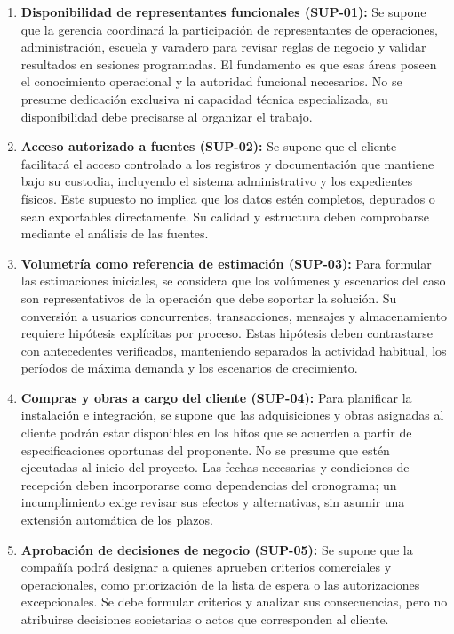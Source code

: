 \begin{enumerate}
    \item \textbf{Disponibilidad de representantes funcionales (SUP-01):} Se supone que la gerencia coordinará la participación de representantes de operaciones, administración, escuela y varadero para revisar reglas de negocio y validar resultados en sesiones programadas. El fundamento es que esas áreas poseen el conocimiento operacional y la autoridad funcional necesarios. No se presume dedicación exclusiva ni capacidad técnica especializada, su disponibilidad debe precisarse al organizar el trabajo.

    \item \textbf{Acceso autorizado a fuentes (SUP-02):} Se supone que el cliente facilitará el acceso controlado a los registros y documentación que mantiene bajo su custodia, incluyendo el sistema administrativo y los expedientes físicos. Este supuesto no implica que los datos estén completos, depurados o sean exportables directamente. Su calidad y estructura deben comprobarse mediante el análisis de las fuentes.

    \item \textbf{Volumetría como referencia de estimación (SUP-03):} Para formular las estimaciones iniciales, se considera que los volúmenes y escenarios del caso son representativos de la operación que debe soportar la solución. Su conversión a usuarios concurrentes, transacciones, mensajes y almacenamiento requiere hipótesis explícitas por proceso. Estas hipótesis deben contrastarse con antecedentes verificados, manteniendo separados la actividad habitual, los períodos de máxima demanda y los escenarios de crecimiento.

    \item \textbf{Compras y obras a cargo del cliente (SUP-04):} Para planificar la instalación e integración, se supone que las adquisiciones y obras asignadas al cliente podrán estar disponibles en los hitos que se acuerden a partir de especificaciones oportunas del proponente. No se presume que estén ejecutadas al inicio del proyecto. Las fechas necesarias y condiciones de recepción deben incorporarse como dependencias del cronograma; un incumplimiento exige revisar sus efectos y alternativas, sin asumir una extensión automática de los plazos.

    \item \textbf{Aprobación de decisiones de negocio (SUP-05):} Se supone que la compañía podrá designar a quienes aprueben criterios comerciales y operacionales, como priorización de la lista de espera o las autorizaciones excepcionales. Se debe formular criterios y analizar sus consecuencias, pero no atribuirse decisiones societarias o actos que corresponden al cliente.
\end{enumerate}

